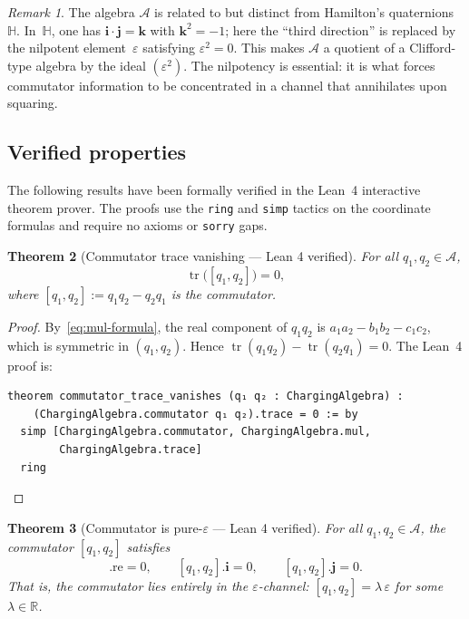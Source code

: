 \documentclass[11pt,a4paper]{article}
\newtheorem{theorem}{Theorem}[section]
\theoremstyle{definition}
\theoremstyle{remark}
\newtheorem{remark}[theorem]{Remark}
\DeclareMathOperator{\tr}{tr}
\begin{document}
\begin{remark}
The algebra $\mathcal{A}$ is related to but distinct from Hamilton's
quaternions~$\mathbb{H}$. In~$\mathbb{H}$, one has
$\mathbf{i} \cdot \mathbf{j} = \mathbf{k}$ with
$\mathbf{k}^2 = -1$; here the ``third direction'' is replaced by
the nilpotent element~$\varepsilon$ satisfying $\varepsilon^2 = 0$.
This makes $\mathcal{A}$ a quotient of a Clifford-type algebra by
the ideal $(\varepsilon^2)$. The nilpotency is essential: it is what
forces commutator information to be concentrated in a channel that
annihilates upon squaring.
\end{remark}

\subsection{Verified properties}

The following results have been formally verified in the Lean~4
interactive theorem prover. The proofs use the \texttt{ring} and
\texttt{simp} tactics on the coordinate formulas and require no
axioms or \texttt{sorry} gaps.

\begin{theorem}[Commutator trace vanishing --- Lean 4 verified]
\label{thm:trace-vanish}
For all $q_1, q_2 \in \mathcal{A}$,
\begin{equation}
  \tr\bigl([q_1, q_2]\bigr) = 0,
\end{equation}
where $[q_1, q_2] := q_1 q_2 - q_2 q_1$ is the commutator.
\end{theorem}

\begin{proof}
By~\eqref{eq:mul-formula}, the real component of $q_1 q_2$ is
$a_1 a_2 - b_1 b_2 - c_1 c_2$, which is symmetric in
$(q_1, q_2)$. Hence
$\tr(q_1 q_2) - \tr(q_2 q_1) = 0$.
The Lean~4 proof is:
\begin{lstlisting}[language=Lean]
theorem commutator_trace_vanishes (q₁ q₂ : ChargingAlgebra) :
    (ChargingAlgebra.commutator q₁ q₂).trace = 0 := by
  simp [ChargingAlgebra.commutator, ChargingAlgebra.mul,
        ChargingAlgebra.trace]
  ring
\end{lstlisting}
\end{proof}

\begin{theorem}[Commutator is pure-$\varepsilon$ --- Lean 4 verified]
\label{thm:pure-eps}
For all $q_1, q_2 \in \mathcal{A}$, the commutator
$[q_1, q_2]$ satisfies
\begin{equation}
  [q_1, q_2].\mathrm{re} = 0, \qquad
  [q_1, q_2].\mathbf{i} = 0, \qquad
  [q_1, q_2].\mathbf{j} = 0.
\end{equation}
That is, the commutator lies entirely in the $\varepsilon$-channel:
$[q_1, q_2] = \lambda\,\varepsilon$ for some $\lambda \in \mathbb{R}$.
\end{theorem}
\end{document}
